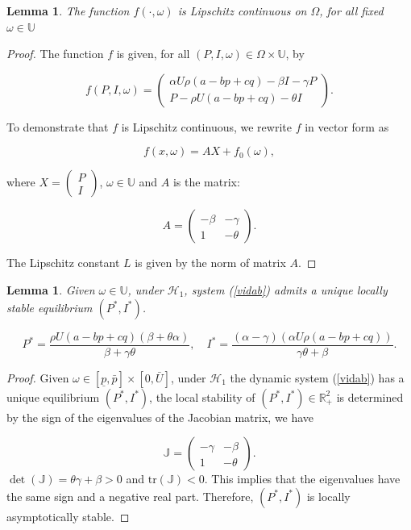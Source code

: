 \documentclass[]{interact}
\theoremstyle{plain}%
\newtheorem{lemma}[theorem]{Lemma}
\theoremstyle{definition}
\theoremstyle{remark}
\begin{document}
\begin{lemma}
	The function $f(\cdot,\omega)$ is Lipschitz continuous on $\Omega$, for all fixed $\omega\in  \mathbb{U}$ 
\end{lemma}

\begin{proof}
The function \( f \) is given, for all $(P,I,\omega)\in \Omega\times \mathbb{U}$, by

\[
f(P, I,\omega) = \begin{pmatrix}
\alpha U \rho (a - b p + c q) - \beta I - \gamma P\\
P - \rho U (a - b p + c q) - \theta I 
\end{pmatrix}.
\]

To demonstrate that \( f \) is Lipschitz continuous, we rewrite \( f \) in vector form as

\[
f(x, \omega) = A X + f_0(\omega),
\]

where \( X = \begin{pmatrix} P \\ I \end{pmatrix} \), $\omega\in \mathbb{U}$ and \( A \) is the matrix:

\[
A = \begin{pmatrix}
-\beta & -\gamma \\
1 & -\theta
\end{pmatrix}.
\]

The Lipschitz constant \( L \) is given by the norm of matrix \( A \).

\end{proof}

\begin{lemma}
Given $\omega \in \mathbb{U} $, under $\mathcal{H}_{1}$, system (\ref{vidab}) admits a unique locally stable equilibrium $(P^{*},I^{*})$.

$$
P^{*} =  \frac{\rho U (a - b p + c q) (\beta + \theta \alpha)}{\beta + \gamma \theta}, \quad I^{*}=\frac{(\alpha - \gamma) ( \alpha U \rho(a-b p+c q))}{\gamma \theta +\beta}.
$$
\end{lemma}


\begin{proof}
	 Given $ \omega \in [\underline{p}, \bar{p}]\times [0, \bar{U}] $,  under $\mathcal{H}_{1}$ the dynamic system (\ref{vidab}) has a unique equilibrium $(P^{*},I^{*})$, the local stability of $(P^{*},I^{*}) \in \mathbb{R}^{2}_{+}$ is determined by the sign of the eigenvalues of the Jacobian matrix, we have 

	 \begin{equation*}
	 	\mathbb{J} = 
	 	\begin{pmatrix}
	 		-\gamma & -\beta  \\
	 		1 & -\theta 
	 	\end{pmatrix}.
	 \end{equation*}
 $ \det (\mathbb{J}) = \theta \gamma + \beta > 0 $ and $ \text{tr} (\mathbb{J}) < 0 $. This implies that the eigenvalues have the same sign and a negative real part. Therefore, $(P^{*},I^{*})$ is locally asymptotically stable.
\end{proof}
\end{document}
